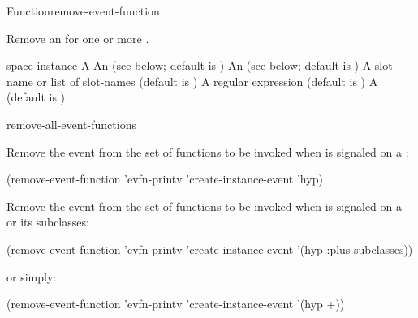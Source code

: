 \documentclass[10pt,twoside,english,pdftex]{article}
\begin{document}

\begin{functiondoc}{Function}{remove-event-function}%
  {
 \nobr{[\var{event-class-specifier\/}}
 \nobr{[\var{unit-class-or-instance-specifier\/}]]}
 }
%


\fnsyntax

\fnpurpose Remove an  for one or more .

\fnpackage {}

\fnmodule {}

\fnargs
\begin{args}{space-instance}
\arg[function] A 
 An  
(see below; default is )
 An 
(see below; default is )
 A slot-name or list of slot-names
(default is )
 A  regular expression
(default is \code{(*)})
\arg[permanent] A  (default is \nil)
\end{args}

\fndsyntax
\W\supp\tabletop
\eventclassspec
\subeventingspec
\syntaxsep
\unitclassinstancespec
\subclassingspec

\begin{alsos}{remove-all-event-functions}
\end{alsos}

\fnexamples 
{}%
%
Remove the event   from
the set of functions to be invoked when  is
signaled on a  :
%
\W\supp
\begin{example}
  (remove-event-function 'evfn-printv 'create-instance-event 'hyp)
\end{example}
%
Remove the event   from
the set of functions to be invoked when  is
signaled on a   or its subclasses:
%
\W\supp\notpretop
\begin{example}
  (remove-event-function 'evfn-printv 'create-instance-event '(hyp :plus-subclasses))
\end{example}
%
or simply:
%
\W\supp\notpretop
\begin{example}
  (remove-event-function 'evfn-printv 'create-instance-event '(hyp +))
\end{example}


\end{functiondoc}
\end{document}
